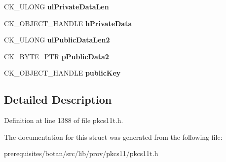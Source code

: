 \begin{DoxyCompactItemize}
C\+K\+\_\+\+U\+L\+O\+NG {\bfseries ul\+Private\+Data\+Len}
\item 
\mbox{\label{struct_c_k___x9__42___m_q_v___d_e_r_i_v_e___p_a_r_a_m_s_a202106581bbc13cd08cbff4f8f9df3df}} 
C\+K\+\_\+\+O\+B\+J\+E\+C\+T\+\_\+\+H\+A\+N\+D\+LE {\bfseries h\+Private\+Data}
\item 
\mbox{\label{struct_c_k___x9__42___m_q_v___d_e_r_i_v_e___p_a_r_a_m_s_a9b1100d4e5f10f069d19f499026bd17f}} 
C\+K\+\_\+\+U\+L\+O\+NG {\bfseries ul\+Public\+Data\+Len2}
\item 
\mbox{\label{struct_c_k___x9__42___m_q_v___d_e_r_i_v_e___p_a_r_a_m_s_ab63864d1ecfafc214c349cb7cbda1301}} 
C\+K\+\_\+\+B\+Y\+T\+E\+\_\+\+P\+TR {\bfseries p\+Public\+Data2}
\item 
\mbox{\label{struct_c_k___x9__42___m_q_v___d_e_r_i_v_e___p_a_r_a_m_s_a25bc899e09c2c9c65f97da51a6651c1f}} 
C\+K\+\_\+\+O\+B\+J\+E\+C\+T\+\_\+\+H\+A\+N\+D\+LE {\bfseries public\+Key}
\end{DoxyCompactItemize}


\subsection{Detailed Description}


Definition at line 1388 of file pkcs11t.\+h.



The documentation for this struct was generated from the following file\+:\begin{DoxyCompactItemize}
\item 
prerequisites/botan/src/lib/prov/pkcs11/pkcs11t.\+h\end{DoxyCompactItemize}
